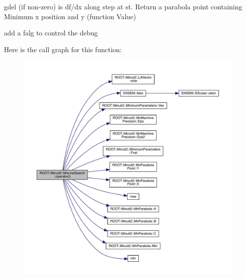 gdel (if non-\/zero) is df/dx along step at st. Return a parabola point containing Minimum x position and y (function Value)
\begin{DoxyItemize}
\item add a falg to control the debug 
\end{DoxyItemize}Here is the call graph for this function\+:\nopagebreak
\begin{figure}[H]
\begin{center}
\leavevmode
\includegraphics[width=350pt]{d0/dd1/classROOT_1_1Minuit2_1_1MnLineSearch_a4caf80e70d50f3bfa149d28836d26a95_cgraph}
\end{center}
\end{figure}
\mbox{\label{classROOT_1_1Minuit2_1_1MnLineSearch_a4caf80e70d50f3bfa149d28836d26a95}} 
